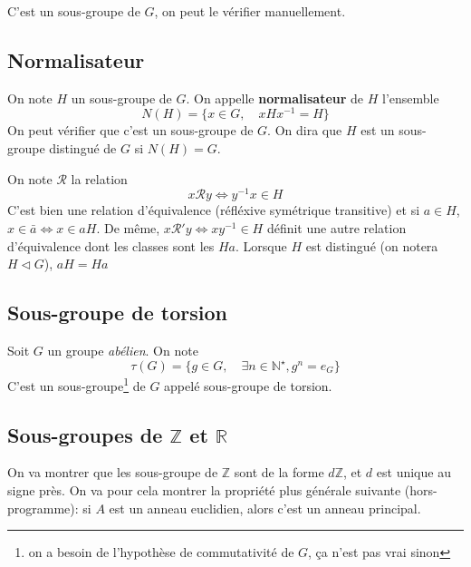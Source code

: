 \begin{rem}
    C'est un sous-groupe de $G$, on peut le vérifier manuellement.
\end{rem}

\subsection{Normalisateur}

On note $H$ un sous-groupe de $G$. On appelle \textbf{normalisateur} de $H$ l'ensemble \[
    N(H)=\{x\in G, \quad xHx^{-1}=H\}
\]
On peut vérifier que c'est un sous-groupe de $G$. On dira que $H$ est un sous-groupe distingué  de $G$ si $N(H)=G$.

\begin{rem}
    On note $\mathcal R$ la relation \[
        x\mathcal Ry\iff y^{-1}x\in H
    \]
    C'est bien une relation d'équivalence (réfléxive symétrique transitive) et si $a\in H$, $x\in \bar a \iff x\in aH$. De même, $x\mathcal R'y\iff xy^{-1}\in H$ définit une autre relation d'équivalence dont les classes sont les $Ha$. Lorsque $H$ est distingué (on notera $H\triangleleft G$), $aH=Ha$
\end{rem}

\subsection{Sous-groupe de torsion}

Soit $G$ un groupe \emph{abélien}. On note \[
    \tau(G)=\{g\in G, \quad \exists n\in\mathbb N^\star, g^n=e_G\}
\]
C'est un sous-groupe\footnote{on a besoin de l'hypothèse de commutativité de $G$, ça n'est pas vrai sinon} de $G$ appelé sous-groupe de torsion.

\subsection{Sous-groupes de $\mathbb Z$ et $\mathbb R$}

On va montrer que les sous-groupe de $\mathbb Z$ sont de la forme $d\mathbb Z$, et $d$ est unique au signe près.
On va pour cela montrer la propriété plus générale suivante (hors-programme): si $A$ est un anneau euclidien, alors c'est un anneau principal.

